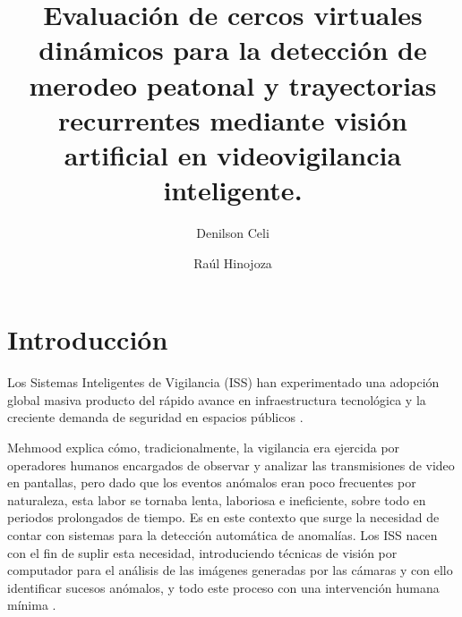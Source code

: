 \documentclass[runningheads]{llncs}
\begin{document}
\renewcommand{\tablename}{Tabla}
%
\title{Evaluación de cercos virtuales dinámicos para la detección de merodeo peatonal y trayectorias recurrentes mediante visión artificial en videovigilancia inteligente.}
%
%
\author{Denilson Celi \and
Raúl Hinojoza}
%
%
%
\maketitle              %
%
 
 
%
%
%
\section{Introducción}

Los Sistemas Inteligentes de Vigilancia (ISS) han experimentado una adopción global masiva producto del rápido avance en infraestructura tecnológica y la creciente demanda de seguridad en espacios públicos \cite{choudhry2023,wahyono2023}.

Mehmood \cite{mehmood2021} explica cómo, tradicionalmente, la vigilancia era ejercida por operadores humanos encargados de observar y analizar las transmisiones de video en pantallas, pero dado que los eventos anómalos eran poco frecuentes por naturaleza, esta labor se tornaba lenta, laboriosa e ineficiente, sobre todo en periodos prolongados de tiempo. Es en este contexto que surge la necesidad de contar con sistemas para la detección automática de anomalías. Los ISS nacen con el fin de suplir esta necesidad, introduciendo técnicas de visión por computador para el análisis de las imágenes generadas por las cámaras y con ello identificar sucesos anómalos, y todo este proceso con una intervención humana mínima \cite{wahyono2023}.
\end{document}
